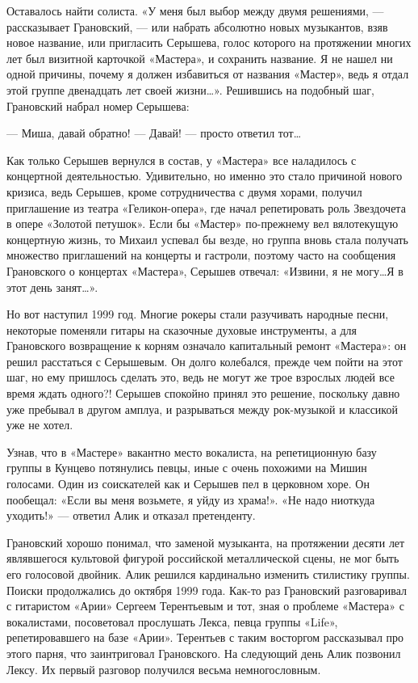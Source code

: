 \documentclass[16pt,a5paper]{book}
\begin{document}
Оставалось найти солиста. «У меня был выбор между двумя решениями, — рассказывает Грановский, — или набрать абсолютно
новых музыкантов, взяв новое название, или пригласить Серышева, голос которого на протяжении многих лет был визитной
карточкой «Мастера», и сохранить название. Я не нашел ни одной причины, почему я должен избавиться от названия «Мастер»,
ведь я отдал этой группе двенадцать лет своей жизни\ldots». Решившись на подобный шаг, Грановский набрал номер Серышева:

— Миша, давай обратно!
— Давай! — просто ответил тот\ldots

Как только Серышев вернулся в состав, у «Мастера» все наладилось с концертной деятельностью. Удивительно, но именно это
стало причиной нового кризиса, ведь Серышев, кроме сотрудничества с двумя хорами, получил приглашение из театра
«Геликон-опера», где начал репетировать роль Звездочета в опере «Золотой петушок». Если бы «Мастер» по-прежнему вел
вялотекущую концертную жизнь, то Михаил успевал бы везде, но группа вновь стала получать множество приглашений на
концерты и гастроли, поэтому часто на сообщения Грановского о концертах «Мастера», Серышев отвечал: «Извини, я не
могу\ldots Я в этот день занят\ldots».

Но вот наступил 1999 год. Многие рокеры стали разучивать народные песни, некоторые поменяли гитары на сказочные духовые
инструменты, а для Грановского возвращение к корням означало капитальный ремонт «Мастера»: он решил расстаться с
Серышевым. Он долго колебался, прежде чем пойти на этот шаг, но ему пришлось сделать это, ведь не могут же трое взрослых
людей все время ждать одного?! Серышев спокойно принял это решение, поскольку давно уже пребывал в другом амплуа, и
разрываться между рок-музыкой и классикой уже не хотел.

Узнав, что в «Мастере» вакантно место вокалиста, на репетиционную базу группы в Кунцево потянулись певцы, иные с очень
похожими на Мишин голосами. Один из соискателей как и Серышев пел в церковном хоре. Он пообещал: «Если вы меня возьмете,
я уйду из храма!». «Не надо ниоткуда уходить!» — ответил Алик и отказал претенденту.

Грановский хорошо понимал, что заменой музыканта, на протяжении десяти лет являвшегося культовой фигурой российской
металлической сцены, не мог быть его голосовой двойник. Алик решился кардинально изменить стилистику группы. Поиски
продолжались до октября 1999 года. Как-то раз Грановский разговаривал с гитаристом «Арии» Сергеем Терентьевым и тот,
зная о проблеме «Мастера» с вокалистами, посоветовал прослушать Лекса, певца группы «Life», репетировавшего на базе
«Арии». Терентьев с таким восторгом рассказывал про этого парня, что заинтриговал Грановского. На следующий день Алик
позвонил Лексу. Их первый разговор получился весьма немногословным.
\end{document}

